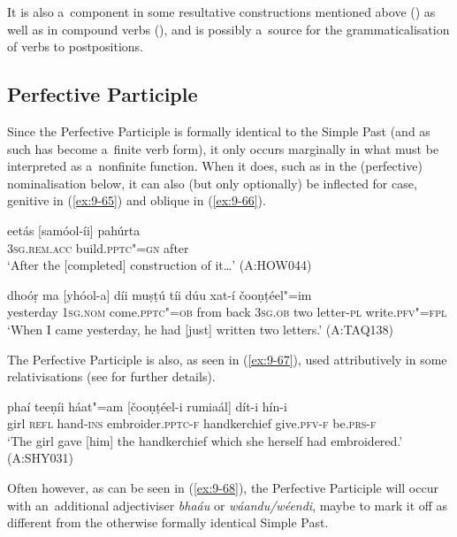It is also a~component in some resultative constructions mentioned above () as well as in compound verbs (), and is possibly a~source for the grammaticalisation of verbs to postpositions.


\subsection{Perfective Participle}
\label{subsec:9-3-2}


Since the Perfective Participle is formally identical to the Simple Past (and as such has become a~finite verb form), it only occurs marginally in what must be interpreted as a~nonfinite function. When it does, such as in the (perfective) nominalisation below, it can also (but only optionally) be inflected for case, genitive in (\ref{ex:9-65}) and oblique in (\ref{ex:9-66}).

\begin{exe}
\ex
\label{ex:9-65}
\gll eetás [samóol-íi] pahúrta \\
\textsc{3sg.rem.acc} build.\textsc{pptc"=gn} after \\
\glt `After the [completed] construction of it{\ldots}' (A:HOW044)

\ex
\label{ex:9-66}
\gll dhoóṛ ma [yhóol-a] díi muṣṭú tíi dúu xat-í čooṇṭéel"=im\\
yesterday 1\textsc{sg.nom} come.\textsc{pptc"=ob} from back \textsc{3sg.ob} two letter-\textsc{pl} write.\textsc{pfv"=fpl}\\
\glt `When I came yesterday, he had [just] written two letters.' (A:TAQ138)
\end{exe}

The Perfective Participle is also, as seen in (\ref{ex:9-67}), used attributively in some relativisations (see  for further details).

\begin{exe}
\ex
\label{ex:9-67}
\gll phaí teeṇíi háat"=am [čooṇṭéel-i rumiaál] dít-i hín-i \\
girl \textsc{refl} hand-\textsc{ins} embroider.\textsc{pptc-f} handkerchief give.\textsc{pfv-f} be.\textsc{prs-f} \\
\glt `The girl gave [him] the handkerchief which she herself had embroidered.' (A:SHY031)
\end{exe}

Often however, as can be seen in (\ref{ex:9-68}), the Perfective Participle will occur with an~additional adjectiviser \textit{bhaáu} or \textit{wáandu/wéendi}, maybe to mark it off as different from the otherwise formally identical Simple Past.

